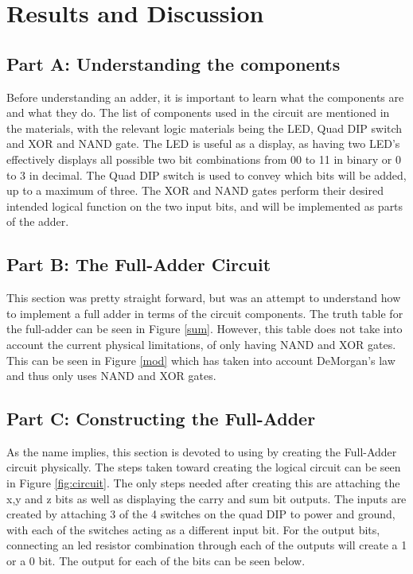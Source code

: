 \documentclass[10pt]{article}
\begin{document}
\section{Results and Discussion}

\subsection{Part A: Understanding the components}

Before understanding an adder, it is important to learn what the components are and what they do. The list of components used in the circuit are mentioned in the materials, with the relevant logic materials being the LED, Quad DIP switch and XOR and NAND gate. The LED is useful as a display, as having two LED's effectively displays all possible two bit combinations from 00 to 11 in binary or 0 to 3 in decimal. The Quad DIP switch is used to convey which bits will be added, up to a maximum of three. The XOR and NAND gates perform their desired intended logical function on the two input bits, and will be implemented as parts of the adder.

\subsection{Part B: The Full-Adder Circuit}

This section was pretty straight forward, but was an attempt to understand how to implement a full adder in  terms of the circuit components. The truth table for the full-adder can be seen in Figure \ref{sum}. However, this table does not take into account the current physical limitations, of only having NAND and XOR gates. This can be seen in Figure \ref{mod} which has taken into account DeMorgan's law and thus only uses NAND and XOR gates. 

\subsection{Part C: Constructing the Full-Adder}

As the name implies, this section is devoted to using by creating the Full-Adder circuit physically. The steps taken toward creating the logical circuit can be seen in Figure \ref{fig:circuit}. The only steps needed after creating this are attaching the x,y and z bits as well as displaying the carry and sum bit outputs. The inputs are created by attaching 3 of the 4 switches on the quad DIP to power and ground, with each of the switches acting as a different input bit. For the output bits, connecting an led resistor combination through each of the outputs will create a 1 or a 0 bit. The output for each of the bits can be seen below.
\end{document}

